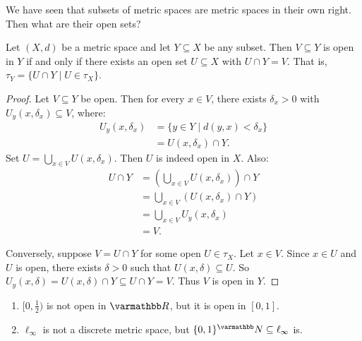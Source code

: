     We have seen that subsets of metric spaces are metric spaces in their own right. Then what are their open sets?

    \begin{proposition}
        Let $(X,d)$ be a metric space and let $Y \subseteq X$ be any subset. Then $V \subseteq Y$ is open in $Y$ if and only if there exists an open set $U \subseteq X$ with $U \cap Y = V$. That is, $\tau_Y = \{U \cap Y \mid U \in \tau_X\}$.
    \end{proposition}   
        \begin{proof}
            Let $V \subseteq Y$ be open. Then for every $x \in V$, there exists $\delta_x > 0$ with $U_y(x,\delta_x) \subseteq V$, where:
                \begin{equation*}
                \begin{split}
                    U_y(x,\delta_x)
                    & = \{y \in Y \mid d(y,x) < \delta_x \} \\
                    & = U(x,\delta_x) \cap Y.
                \end{split}
                \end{equation*} 
            Set $U = \bigcup_{x \in V}U(x,\delta_x)$. Then $U$ is indeed open in $X$. Also:
                \begin{equation*}
                \begin{split}
                    U \cap Y 
                    & = \left(\bigcup_{x \in V} U(x,\delta_x) \right) \cap Y \\
                    & = \bigcup_{x \in V} \left(U(x,\delta_x) \cap Y \right) \\
                    & = \bigcup_{x \in V}U_y(x,\delta_x) \\
                    & = V.
                \end{split}
                \end{equation*}

            Conversely, suppose $V = U \cap Y$ for some open $U \in \tau_X$. Let $x \in V$. Since $x \in U$ and $U$ is open, there exists $\delta > 0$ such that $U(x,\delta) \subseteq U$. So $U_y(x,\delta) = U(x,\delta) \cap Y \subseteq U \cap Y = V$. Thus $V$ is open in $Y$.
        \end{proof}

        \begin{example}
            \phantom{a}
            \begin{enumerate}[label = (\arabic*),itemsep=1pt,topsep=3pt]
                \item $[0,\frac{1}{2})$ is not open in $\bfR$, but it is open in $[0,1]$.
                \item $\ell_\infty$ is not a discrete metric space, but $\{0,1\}^\bfN \subseteq \ell_\infty$ is.
            \end{enumerate}
        \end{example}

